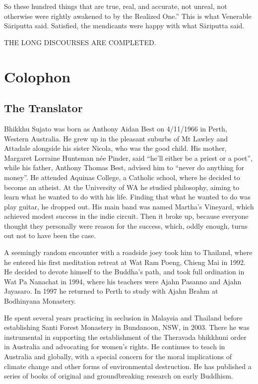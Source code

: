 \documentclass[12pt,openany]{book}%
\newcommand*{\scendbook}[1]{\begin{center}\uppercase{#1}\end{center}}
\let\oldbackmatter\backmatter
\renewcommand{\backmatter}{%
\chapterfont{\setstretch{.85}\normalfont\centering}%
\sectionfont{\setstretch{.85}\Semiboldsubheadfont}%
\oldbackmatter}
\begin{document}
So these hundred things that are true, real, and accurate, not unreal, not otherwise were rightly awakened to by the Realized One.” This is what Venerable \textsanskrit{Sāriputta} said. Satisfied, the mendicants were happy with what \textsanskrit{Sāriputta} said. 

\scendbook{The Long Discourses are completed. }

%
\backmatter%
\chapter*{Colophon}

\section*{The Translator}

Bhikkhu Sujato was born as Anthony Aidan Best on 4/11/1966 in Perth, Western Australia. He grew up in the pleasant suburbs of Mt Lawley and Attadale alongside his sister Nicola, who was the good child. His mother, Margaret Lorraine Huntsman née Pinder, said “he’ll either be a priest or a poet”, while his father, Anthony Thomas Best, advised him to “never do anything for money”. He attended Aquinas College, a Catholic school, where he decided to become an atheist. At the University of WA he studied philosophy, aiming to learn what he wanted to do with his life. Finding that what he wanted to do was play guitar, he dropped out. His main band was named Martha’s Vineyard, which achieved modest success in the indie circuit. Then it broke up, because everyone thought they personally were reason for the success, which, oddly enough, turns out not to have been the case. 

A seemingly random encounter with a roadside joey took him to Thailand, where he entered his first meditation retreat at Wat Ram Poeng, Chieng Mai in 1992. He decided to devote himself to the Buddha’s path, and took full ordination in Wat Pa Nanachat in 1994, where his teachers were Ajahn Pasanno and Ajahn Jayasaro. In 1997 he returned to Perth to study with Ajahn Brahm at Bodhinyana Monastery. 

He spent several years practicing in seclusion in Malaysia and Thailand before establishing Santi Forest Monastery in Bundanoon, NSW, in 2003. There he was instrumental in supporting the establishment of the Theravada bhikkhuni order in Australia and advocating for women’s rights. He continues to teach in Australia and globally, with a special concern for the moral implications of climate change and other forms of environmental destruction. He has published a series of books of original and groundbreaking research on early Buddhism. 
\end{document}
